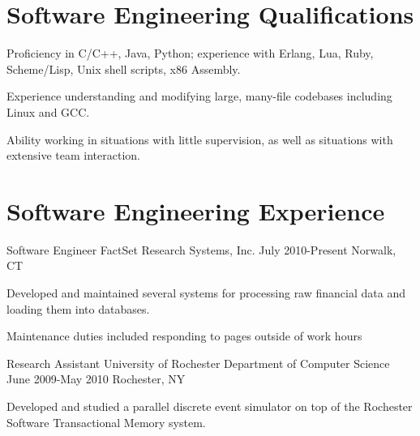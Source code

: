 \documentclass[letterpaper]{resume}
\author{Gregory Wilbur}
\begin{document}
\maketitle

\section{Software Engineering Qualifications}
\vspace{\secskip}

\begin{compactitem}
	\item Proficiency in C/C++, Java, Python; experience with Erlang, Lua, Ruby, Scheme/Lisp, Unix shell scripts, x86 Assembly. \par
	\item Experience understanding and modifying large, many-file codebases including Linux and GCC.\par
	\item Ability working in situations with little supervision, as well as situations with extensive team interaction. \par
\end{compactitem}

\section{Software Engineering Experience}

\affiliation
{Software Engineer}
{FactSet Research Systems, Inc.}
{July 2010-Present}
{Norwalk, CT}

\begin{compactitem}
	\item Developed and maintained several systems for processing raw financial data and loading them into databases. \par
	\item Maintenance duties included responding to pages outside of work hours \par
\end{compactitem}

\affiliation
{Research Assistant}
{University of Rochester Department of Computer Science}
{June 2009-May 2010}
{Rochester, NY}

\begin{compactitem}
	\item Developed and studied a parallel discrete event simulator on top of the Rochester Software Transactional Memory system. \par
\end{compactitem}
\end{document}
